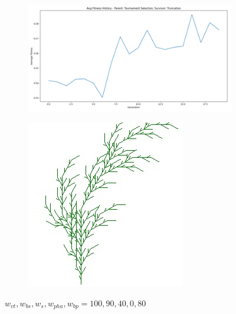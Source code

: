 \begin{figure}[H]
    \centering
    \begin{subfigure}[b]{0.3\textwidth}
        \includegraphics[width=\textwidth]{image3.png}
    \end{subfigure}
    \begin{subfigure}[b]{0.1\textwidth}
        \includegraphics[width=\textwidth]{image6.png}
    \end{subfigure}

    \vspace{0.5cm}
    \caption{$w_{vt}, w_{bs}, w_{s}, w_{pha}, w_{bp} = 100, 90, 40, 0, 80$}
    \label{fig:mutation_comparison}
\end{figure}

